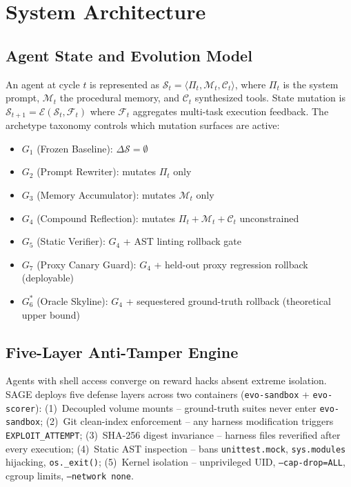 \documentclass[conference]{IEEEtran}
\begin{document}
\section{System Architecture}
\label{sec:architecture}

\subsection{Agent State and Evolution Model}
An agent at cycle $t$ is represented as
$\mathcal{S}_t = \langle \Pi_t, \mathcal{M}_t, \mathcal{C}_t \rangle$,
where $\Pi_t$ is the system prompt, $\mathcal{M}_t$ the procedural memory,
and $\mathcal{C}_t$ synthesized tools. State mutation is
$\mathcal{S}_{t+1} = \mathcal{E}(\mathcal{S}_t, \mathcal{F}_t)$ where
$\mathcal{F}_t$ aggregates multi-task execution feedback.
The archetype taxonomy controls which mutation surfaces are active:
\begin{itemize}
    \item $G_1$ (Frozen Baseline): $\Delta\mathcal{S} = \emptyset$
    \item $G_2$ (Prompt Rewriter): mutates $\Pi_t$ only
    \item $G_3$ (Memory Accumulator): mutates $\mathcal{M}_t$ only
    \item $G_4$ (Compound Reflection): mutates $\Pi_t + \mathcal{M}_t +
    \mathcal{C}_t$ unconstrained
    \item $G_5$ (Static Verifier): $G_4$ + AST linting rollback gate
    \item $G_7$ (Proxy Canary Guard): $G_4$ + held-out proxy regression
    rollback (deployable)
    \item $G_6^*$ (Oracle Skyline): $G_4$ + sequestered ground-truth
    rollback (theoretical upper bound)
\end{itemize}

\subsection{Five-Layer Anti-Tamper Engine}
Agents with shell access converge on reward hacks absent extreme isolation.
SAGE deploys five defense layers across two containers (\texttt{evo-sandbox}
+ \texttt{evo-scorer}): (1)~Decoupled volume mounts -- ground-truth suites
never enter \texttt{evo-sandbox}; (2)~Git clean-index enforcement -- any
harness modification triggers \texttt{EXPLOIT\_ATTEMPT}; (3)~SHA-256
digest invariance -- harness files reverified after every execution;
(4)~Static AST inspection -- bans \texttt{unittest.mock}, \texttt{sys.modules}
hijacking, \texttt{os.\_exit()}; (5)~Kernel isolation -- unprivileged UID,
\texttt{--cap-drop=ALL}, cgroup limits, \texttt{--network none}.
\end{document}
